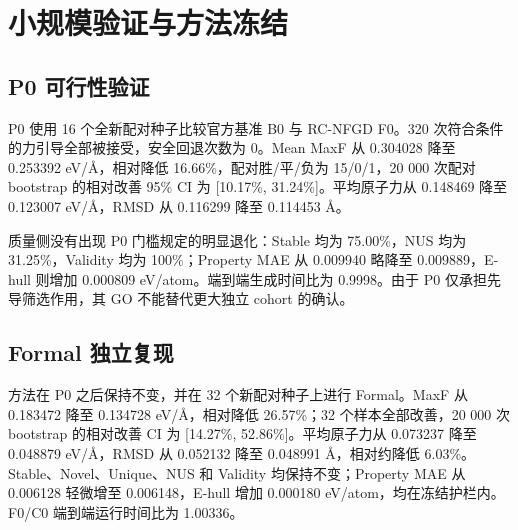 \section{小规模验证与方法冻结}

\subsection{P0 可行性验证}

P0 使用 16 个全新配对种子比较官方基准 B0 与 RC-NFGD F0。320 次符合条件的力引导全部被接受，安全回退次数为 0。Mean MaxF 从 0.304028 降至 0.253392 eV/Å，相对降低 16.66\%，配对胜/平/负为 15/0/1，20 000 次配对 bootstrap 的相对改善 95\% CI 为 {[}10.17\%, 31.24\%{]}。平均原子力从 0.148469 降至 0.123007 eV/Å，RMSD 从 0.116299 降至 0.114453 Å。

质量侧没有出现 P0 门槛规定的明显退化：Stable 均为 75.00\%，NUS 均为 31.25\%，Validity 均为 100\%；Property MAE 从 0.009940 略降至 0.009889，E-hull 则增加 0.000809 eV/atom。端到端生成时间比为 0.9998。由于 P0 仅承担先导筛选作用，其 GO 不能替代更大独立 cohort 的确认。

\subsection{Formal 独立复现}

方法在 P0 之后保持不变，并在 32 个新配对种子上进行 Formal。MaxF 从 0.183472 降至 0.134728 eV/Å，相对降低 26.57\%；32 个样本全部改善，20 000 次 bootstrap 的相对改善 CI 为 {[}14.27\%, 52.86\%{]}。平均原子力从 0.073237 降至 0.048879 eV/Å，RMSD 从 0.052132 降至 0.048991 Å，相对约降低 6.03\%。Stable、Novel、Unique、NUS 和 Validity 均保持不变；Property MAE 从 0.006128 轻微增至 0.006148，E-hull 增加 0.000180 eV/atom，均在冻结护栏内。F0/C0 端到端运行时间比为 1.00336。


